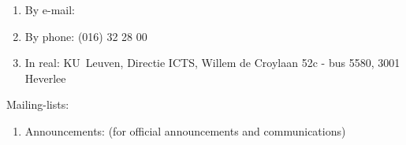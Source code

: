 \begin{enumerate}
\item  By e-mail:  \hpcinfo
\item  By phone: (016) 32 28 00
\item  In real: KU~Leuven, Directie ICTS, Willem de Croylaan 52c - bus 5580, 3001 Heverlee
\end{enumerate}

Mailing-lists:

\begin{enumerate}
\item  Announcements: \hpcannounceml (for official announcements and communications)
\end{enumerate}

